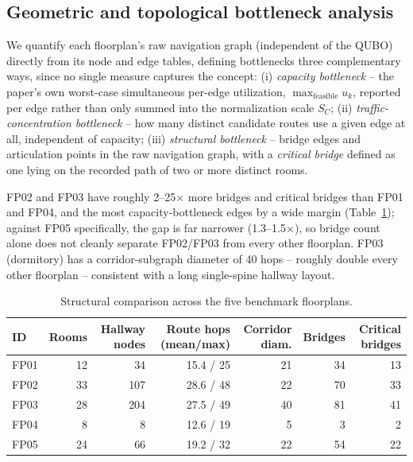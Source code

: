 \documentclass[11pt]{article}
\begin{document}
\subsection{Geometric and topological bottleneck analysis}
\label{sec:geometry}
We quantify each floorplan's raw navigation graph (independent of the QUBO) directly from its node and edge tables, defining bottlenecks three complementary ways, since no single measure captures the concept: (i) \textit{capacity bottleneck} -- the paper's own worst-case simultaneous per-edge utilization, $\max_{\text{feasible}} u_k$, reported per edge rather than only summed into the normalization scale $S_C$; (ii) \textit{traffic-concentration bottleneck} -- how many distinct candidate routes use a given edge at all, independent of capacity; (iii) \textit{structural bottleneck} -- bridge edges and articulation points in the raw navigation graph, with a \textit{critical bridge} defined as one lying on the recorded path of two or more distinct rooms.

FP02 and FP03 have roughly 2--25$\times$ more bridges and critical bridges than FP01 and FP04, and the most capacity-bottleneck edges by a wide margin (Table~\ref{tab:geometry}); against FP05 specifically, the gap is far narrower (1.3--1.5$\times$), so bridge count alone does not cleanly separate FP02/FP03 from every other floorplan. FP03 (dormitory) has a corridor-subgraph diameter of 40 hops -- roughly double every other floorplan -- consistent with a long single-spine hallway layout.

\begin{table}[h]
\centering
\caption{Structural comparison across the five benchmark floorplans.}
\label{tab:geometry}
\small
\begin{tabular}{lrrrrrr}
\toprule
ID & Rooms & Hallway nodes & Route hops (mean/max) & Corridor diam. & Bridges & Critical bridges \\
\midrule
FP01 & 12 & 34 & 15.4 / 25 & 21 & 34 & 13 \\
FP02 & 33 & 107 & 28.6 / 48 & 22 & 70 & 33 \\
FP03 & 28 & 204 & 27.5 / 49 & 40 & 81 & 41 \\
FP04 & 8 & 8 & 12.6 / 19 & 5 & 3 & 2 \\
FP05 & 24 & 66 & 19.2 / 32 & 22 & 54 & 22 \\
\bottomrule
\end{tabular}
\end{table}
\end{document}
